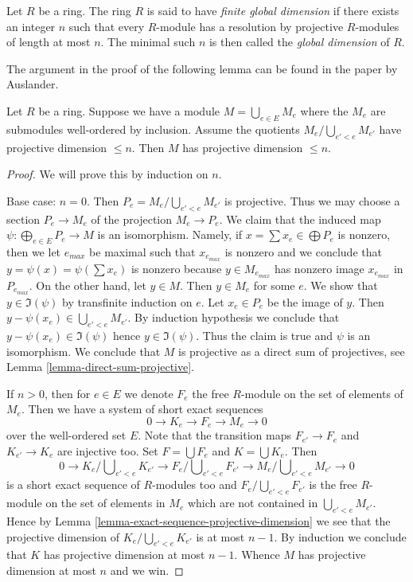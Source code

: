 \begin{definition}
\label{definition-finite-gl-dim}
Let $R$ be a ring. The ring
$R$ is said to have {\it finite global dimension}
if there exists an integer $n$ such that
every $R$-module has a resolution by
projective $R$-modules of length at most $n$.
The minimal such $n$ is then called the {\it global dimension}
of $R$.
\end{definition}

\noindent
The argument in the proof of the following lemma can be found
in the paper \cite{Auslander} by Auslander.

\begin{lemma}
\label{lemma-colimit-projective-dimension}
Let $R$ be a ring. Suppose we have a module $M = \bigcup_{e \in E} M_e$
where the $M_e$ are submodules well-ordered by inclusion. Assume the quotients
$M_e/\bigcup\nolimits_{e' < e} M_{e'}$ have projective dimension $\leq n$.
Then $M$ has projective dimension $\leq n$.
\end{lemma}

\begin{proof}
We will prove this by induction on $n$.

\medskip\noindent
Base case: $n = 0$. Then $P_e = M_e/\bigcup_{e' < e} M_{e'}$ is projective.
Thus we may choose a section $P_e \to M_e$ of the projection $M_e \to P_e$.
We claim that the induced map $\psi : \bigoplus_{e \in E} P_e \to M$ is an
isomorphism. Namely, if $x = \sum x_e \in \bigoplus P_e$ is nonzero,
then we let $e_{max}$ be maximal such that $x_{e_{max}}$ is nonzero
and we conclude that $y = \psi(x) = \psi(\sum x_e)$ is nonzero because
$y \in M_{e_{max}}$ has nonzero image $x_{e_{max}}$ in $P_{e_{max}}$.
On the other hand, let $y \in M$. Then $y \in M_e$ for some $e$.
We show that $y \in \Im(\psi)$ by transfinite induction on $e$.
Let $x_e \in P_e$ be the image of $y$. Then
$y - \psi(x_e) \in \bigcup_{e' < e} M_{e'}$.
By induction hypothesis we conclude that $y - \psi(x_e) \in \Im(\psi)$
hence $y \in \Im(\psi)$. Thus the claim is true and
$\psi$ is an isomorphism. We conclude that $M$ is projective as
a direct sum of projectives, see
Lemma \ref{lemma-direct-sum-projective}.

\medskip\noindent
If $n > 0$, then for $e \in E$ we denote $F_e$ the free $R$-module
on the set of elements of $M_e$. Then we have a system of
short exact sequences
$$
0 \to K_e \to F_e \to M_e \to 0
$$
over the well-ordered set $E$. Note that the transition maps
$F_{e'} \to F_e$ and $K_{e'} \to K_e$ are injective too.
Set $F = \bigcup F_e$ and $K = \bigcup K_e$. Then
$$
0 \to
K_e/\bigcup\nolimits_{e' < e} K_{e'} \to
F_e/\bigcup\nolimits_{e' < e} F_{e'} \to
M_e/\bigcup\nolimits_{e' < e} M_{e'} \to 0
$$
is a short exact sequence of $R$-modules too and
$F_e/\bigcup_{e' < e} F_{e'}$ is the free $R$-module on the
set of elements in $M_e$ which are not contained in $\bigcup_{e' < e} M_{e'}$.
Hence by
Lemma \ref{lemma-exact-sequence-projective-dimension}
we see that the projective dimension of $K_e/\bigcup_{e' < e} K_{e'}$
is at most $n - 1$. By induction we conclude that $K$ has projective
dimension at most $n - 1$. Whence $M$ has projective dimension at most
$n$ and we win.
\end{proof}

